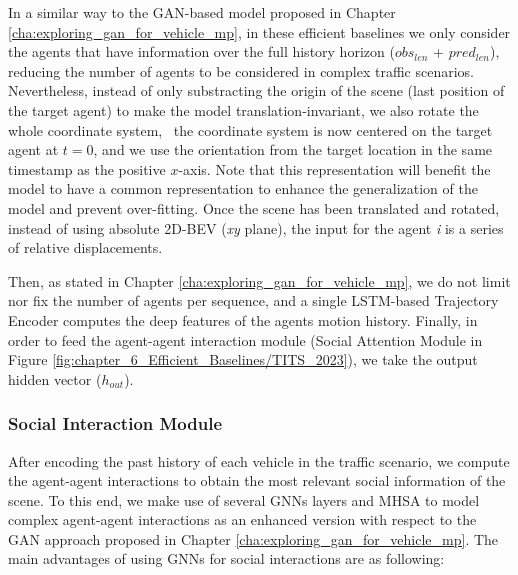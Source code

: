 In a similar way to the \ac{GAN}-based model proposed in Chapter \ref{cha:exploring_gan_for_vehicle_mp}, in these efficient baselines we only consider the agents that have information over the full history horizon (\textit{$obs_{len}$} + \textit{$pred_{len}$}), reducing the number of agents to be considered in complex traffic scenarios. Nevertheless, instead of only substracting the origin of the scene (last position of the target agent) to make the model translation-invariant, we also rotate the whole coordinate system, \ie \ the coordinate system is now centered on the target agent at $t = 0$, and we use the orientation from the target location in the same timestamp as the positive $x$-axis. Note that this representation will benefit the model to have a common representation to enhance the generalization of the model and prevent over-fitting. Once the scene has been translated and rotated, instead of using absolute 2D-\ac{BEV} (\textit{xy} plane), the input for the agent \textit{i} is a series of relative displacements.

Then, as stated in Chapter \ref{cha:exploring_gan_for_vehicle_mp}, we do not limit nor fix the number of agents per sequence, and a single \ac{LSTM}-based Trajectory Encoder computes the deep features of the agents motion history. Finally, in order to feed the agent-agent interaction module (Social Attention Module in Figure \ref{fig:chapter_6_Efficient_Baselines/TITS_2023}), we take the output hidden vector ($h_{out}$).

\subsubsection{Social Interaction Module}
\label{subsubsec:6_efficient_baselines_social_interactions}

After encoding the past history of each vehicle in the traffic scenario, we compute the agent-agent interactions to obtain the most relevant social information of the scene. To this end, we make use of several \acp{GNN} layers and \ac{MHSA} to model complex agent-agent interactions as an enhanced version with respect to the \ac{GAN} approach proposed in Chapter \ref{cha:exploring_gan_for_vehicle_mp}. The main advantages of using \acp{GNN} for social interactions are as following:

